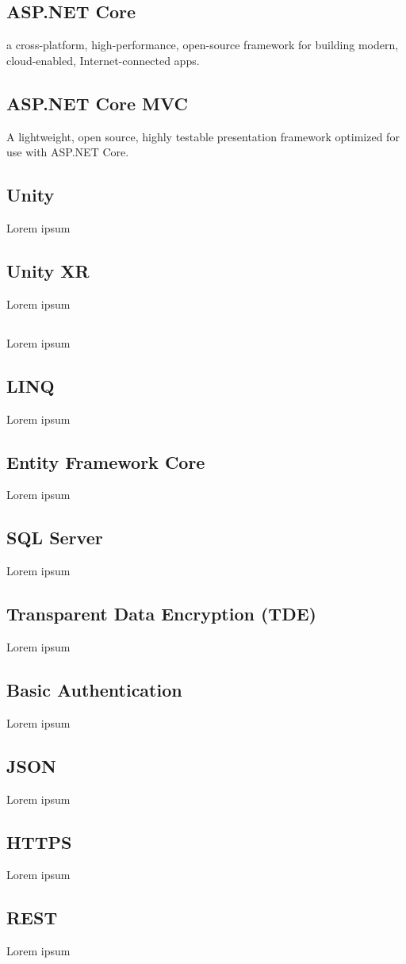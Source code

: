 \subsection*{ASP.NET Core}
a cross-platform, high-performance, open-source framework for building modern, cloud-enabled, Internet-connected apps.
\subsection*{ASP.NET Core MVC}
A lightweight, open source, highly testable presentation framework optimized for use with ASP.NET Core.
\subsection*{Unity}
Lorem ipsum
\subsection*{Unity XR}
Lorem ipsum
\subsection*{\C}
Lorem ipsum
\subsection*{LINQ}
Lorem ipsum
\subsection*{Entity Framework Core}
Lorem ipsum
\subsection*{SQL Server}
Lorem ipsum
\subsection*{Transparent Data Encryption (TDE)}
Lorem ipsum
\subsection*{Basic Authentication}
Lorem ipsum
\subsection*{JSON}
Lorem ipsum
\subsection*{HTTPS}
Lorem ipsum
\subsection*{REST}
Lorem ipsum
